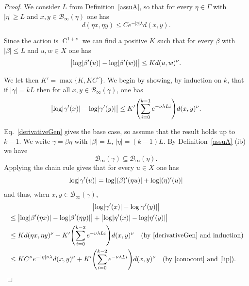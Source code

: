 \documentclass[AHL,Unicode,longabstracts,MathTools]{cedram}
\DeclareMathOperator{\class}{C}
\renewcommand{\sf}[1]{{\mathsf{#1}}}
\newcommand{\G}{\sf{\Gamma}}
\newcommand{\cal}{\mathcal}
\newcommand{\g}{\gamma}
\renewcommand{\/}{\backslash}
\newcommand{\<}{\langle}
\renewcommand{\>}{\rangle}
\let\originalleft\left
\let\originalright\right
\renewcommand{\left}{\mathopen{}\mathclose\bgroup\originalleft}
\renewcommand{\right}{\aftergroup\egroup\originalright}
\begin{document}
\begin{proof}
We consider $L$ from Definition~\ref{assuA}, so that for every $\eta\in\G$ with $|\eta|\geq L$ and $x,y\in\cal B_\infty(\eta)$ one has
\begin{equation}\label{lip}
d(\eta x,\eta y)\leq Ce^{-|\eta|\lambda}d(x,y).
\end{equation}

Since the action is $\class^{1+\nu}$ we can find a positive $K$ such that for every $\beta$ with $|\beta|\leq L$ and $u,w\in X$ one has
\begin{equation}\label{derivativeGen}
\bigl\lvert\log\left|\beta'(u)\right|-\log\left|\beta'(w)\right|\bigr|\leq Kd(u,w)^\nu.
\end{equation}

We let then $K'=\max\{K,KC^\nu\}$. We begin by showing, by induction on $k$, that if $|\g|=kL$ then for all $x,y\in\cal B_\infty(\g)$, one has
\begin{equation}\label{induc}
\bigl\lvert\log\left|\g'(x)\right|-\log\left|\g'(y)\right|\bigr|\leq K'\left(\sum_{i=0}^{k-1}e^{-\nu\lambda L i}\right)d(x,y)^\nu.
\end{equation}

Eq.~\eqref{derivativeGen} gives the base case, so assume that the result holds up to $k-1$. We write $\g=\beta\eta$ with $|\beta|=L$, $|\eta|=(k-1)L$. By Definition~\ref{assuA} (ib) we have
\begin{equation}\label{conocont}
\cal B_\infty(\g)\subseteq\cal B_\infty(\eta).
\end{equation}
Applying the chain rule gives that for every $u\in X$ one has
\[
\log\left|\g'(u)\right|=\log\left|(\beta)'(\eta u)\right|+\log\left|(\eta)'(u)\right|
\]
and thus, when $x,y\in\cal B_\infty(\g)$,
\begin{multline*}
\bigl\lvert\log\left|\g'(x)\right|-\log\left|\g'(y)\right|\bigr\rvert\\
\begin{aligned}
& \leq \bigl\lvert\log\left|\beta'(\eta x)\right|-\log\left|\beta'(\eta y)\right|\bigr\rvert+\bigl|\log\left|\eta'(x)\right| -\log\left|\eta'(y)\right|\bigr|\\
& \leq K d(\eta x,\eta y)^\nu + K'\left(\sum_{i=0}^{k-2}e^{-\nu\lambda L i}\right)d(x,y)^\nu\quad (\text{by~\eqref{derivativeGen} and induction})\\
& \leq KC^\nu e^{-|\eta|\nu\lambda}d(x,y)^\nu+ K'\left(\sum_{i=0}^{k-2}e^{-\nu\lambda L i}\right)d(x,y)^\nu\quad (\text{by~\eqref{conocont} and~\eqref{lip}}).
\end{aligned}
\end{multline*}


\end{proof}
\end{document}
